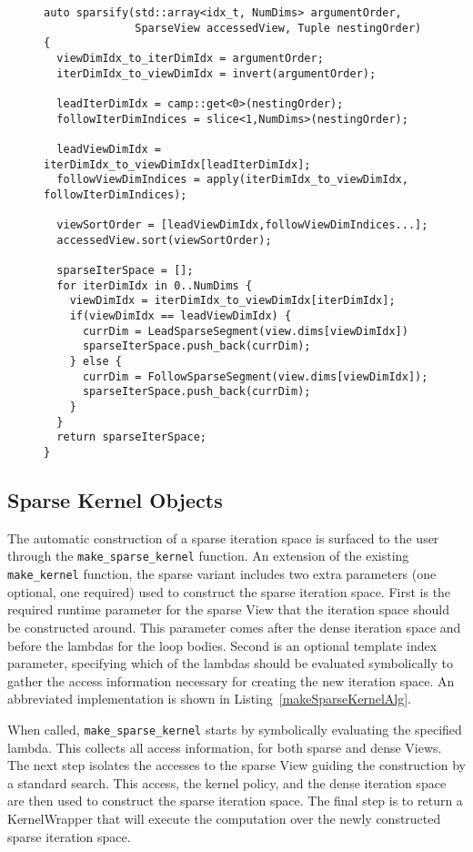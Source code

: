 \begin{figure}
\begin{lstlisting}[caption={Abbreviated algorithm for sparsifying a dense iteration space.}, label=sparsifyAlg]
auto sparsify(std::array<idx_t, NumDims> argumentOrder, 
              SparseView accessedView, Tuple nestingOrder) {
  viewDimIdx_to_iterDimIdx = argumentOrder;
  iterDimIdx_to_viewDimIdx = invert(argumentOrder);

  leadIterDimIdx = camp::get<0>(nestingOrder);
  followIterDimIndices = slice<1,NumDims>(nestingOrder);

  leadViewDimIdx = iterDimIdx_to_viewDimIdx[leadIterDimIdx];
  followViewDimIndices = apply(iterDimIdx_to_viewDimIdx, followIterDimIndices);

  viewSortOrder = [leadViewDimIdx,followViewDimIndices...];
  accessedView.sort(viewSortOrder);

  sparseIterSpace = [];
  for iterDimIdx in 0..NumDims {
    viewDimIdx = iterDimIdx_to_viewDimIdx[iterDimIdx];
    if(viewDimIdx == leadViewDimIdx) {
      currDim = LeadSparseSegment(view.dims[viewDimIdx])
      sparseIterSpace.push_back(currDim);
    } else {
      currDim = FollowSparseSegment(view.dims[viewDimIdx]);
      sparseIterSpace.push_back(currDim);
    }
  }
  return sparseIterSpace;
}
\end{lstlisting}
\end{figure}

\subsection{Sparse Kernel Objects}

The automatic construction of a sparse iteration space is surfaced to the user through the \verb.make_sparse_kernel. function.
An extension of the existing \verb.make_kernel. function, the sparse variant includes two extra parameters (one optional, one required) used to construct the sparse iteration space.
First is the required runtime parameter for the sparse View that the iteration space should be constructed around.
This parameter comes after the dense iteration space and before the lambdas for the loop bodies.
Second is an optional template index parameter, specifying which of the lambdas should be evaluated symbolically to gather the access information necessary for creating the new iteration space.
An abbreviated implementation is shown in Listing~\ref{makeSparseKernelAlg}.

When called, \verb.make_sparse_kernel. starts by symbolically evaluating the specified lambda.
This collects all access information, for both sparse and dense Views.
The next step isolates the accesses to the sparse View guiding the construction by a standard search.
This access, the kernel policy, and the dense iteration space are then used to construct the sparse iteration space.
The final step is to return a KernelWrapper that will execute the computation over the newly constructed sparse iteration space.

